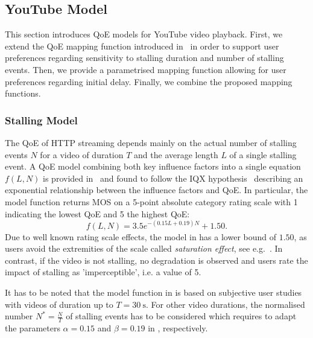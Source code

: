 \subsection{YouTube  Model}\label{sec:application:qoe_user_behaviour:typical_user_scenarios:youtube_qoe}
This section introduces \gls{QoE} models for YouTube video playback.
First, we extend the \gls{QoE} mapping function introduced in~\cite{Hossfeld2013c} in order to support user preferences regarding sensitivity to stalling duration and number of stalling events.
Then, we provide a parametrised mapping function allowing for user preferences regarding initial delay.
Finally, we combine the proposed mapping functions.

\subsubsection*{Stalling  Model}\label{sec:application:qoe_user_behaviour:typical_user_scenarios:youtube_qoe:stalling}
The \gls{QoE} of \gls{HTTP} streaming depends mainly on the actual number of stalling events \(N\) for a video of duration \(T\) and the average length \(L\) of a single stalling event.
A \gls{QoE} model combining both key influence factors into a single equation \(f(L,N)\) is provided in~\cite{Hossfeld2013c} and found to follow the IQX hypothesis~\cite{Fiedler2010} describing an exponential relationship between the influence factors and \gls{QoE}.
In particular, the model function returns \gls{MOS} on a 5-point absolute category rating scale with 1 indicating the lowest \gls{QoE} and 5 the highest \gls{QoE}:
\begin{equation}
 f(L,N) = 3.5 e^{-(0.15L + 0.19)N}+1.50.
\label{eq:application:qoe_user_behaviour:typical_user_scenarios:youtube_qoe:stalling:original_model}
\end{equation}
Due to well known rating scale effects, the model in  has a lower bound of \(1.50\), as users avoid the extremities of the scale called \emph{saturation effect}, see e.g.~\cite{Moller2000}.
In contrast, if the video is not stalling, no degradation is observed and users rate the impact of stalling as 'imperceptible', i.e. a value of 5.

It has to be noted that the model function in  is based on subjective user studies with videos of duration up to \(T=\SI{30}{\second}\).
For other video durations, the normalised number \(N^*=\frac{N}{T}\) of stalling events has to be considered which requires to adapt the parameters \(\alpha=0.15\) and \(\beta=0.19\) in , respectively. 

